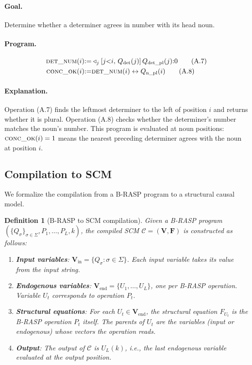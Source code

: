 \documentclass[11pt]{article}
\newtheorem{definition}{Definition}
\begin{document}
\paragraph{Goal.} Determine whether a determiner agrees in number with its head noun.

\paragraph{Program.}
\begin{align}
\textsc{det\_num}(i) &{:=} \triangleleft_j[j{<}i,\, Q_\text{det}(j)]\, Q_\text{det\_pl}(j) {:} 0 \tag{A.7} \\
\textsc{conc\_ok}(i) &{:=} \textsc{det\_num}(i) \leftrightarrow Q_\text{n\_pl}(i) \tag{A.8}
\end{align}

\paragraph{Explanation.}
Operation (A.7) finds the leftmost determiner to the left of position $i$ and returns whether it is plural.
Operation (A.8) checks whether the determiner's number matches the noun's number.
This program is evaluated at noun positions: $\textsc{conc\_ok}(i) = 1$ means the nearest preceding determiner agrees with the noun at position $i$.

\subsection{Compilation to SCM}
\label{app:compile}

We formalize the compilation from a B-RASP program to a structural causal model.

\begin{definition}[B-RASP to SCM compilation]
\label{def:compile-scm}
Given a B-RASP program $(\{Q_\sigma\}_{\sigma \in \Sigma}, P_1, \ldots, P_L, k)$, the compiled SCM $\mathcal{C} = (\mathbf{V}, \mathbf{F})$ is constructed as follows:
\begin{enumerate}[itemsep=2pt,leftmargin=*]
    \item \textbf{Input variables}: $\mathbf{V}_\mathrm{in} = \{Q_\sigma : \sigma \in \Sigma\}$. Each input variable takes its value from the input string.
    \item \textbf{Endogenous variables}: $\mathbf{V}_\mathrm{end} = \{U_1, \ldots, U_L\}$, one per B-RASP operation. Variable $U_t$ corresponds to operation $P_t$.
    \item \textbf{Structural equations}: For each $U_t \in \mathbf{V}_\mathrm{end}$, the structural equation $F_{U_t}$ is the B-RASP operation $P_t$ itself. The parents of $U_t$ are the variables (input or endogenous) whose vectors the operation reads.
    \item \textbf{Output}: The output of $\mathcal{C}$ is $U_L(k)$, i.e., the last endogenous variable evaluated at the output position.
\end{enumerate}
\end{definition}
\end{document}
